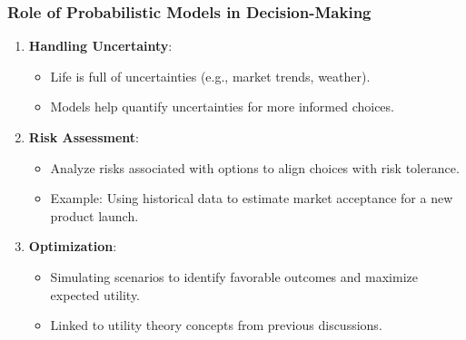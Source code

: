 \documentclass[aspectratio=169]{beamer}
\begin{document}
\begin{frame}[fragile]
    \frametitle{Role of Probabilistic Models in Decision-Making}
    \begin{enumerate}
        \item \textbf{Handling Uncertainty}: 
        \begin{itemize}
            \item Life is full of uncertainties (e.g., market trends, weather).
            \item Models help quantify uncertainties for more informed choices.
        \end{itemize}
        
        \item \textbf{Risk Assessment}:
        \begin{itemize}
            \item Analyze risks associated with options to align choices with risk tolerance.
            \item Example: Using historical data to estimate market acceptance for a new product launch.
        \end{itemize}

        \item \textbf{Optimization}:
        \begin{itemize}
            \item Simulating scenarios to identify favorable outcomes and maximize expected utility.
            \item Linked to utility theory concepts from previous discussions.
        \end{itemize}
    \end{enumerate}
\end{frame}
\end{document}
